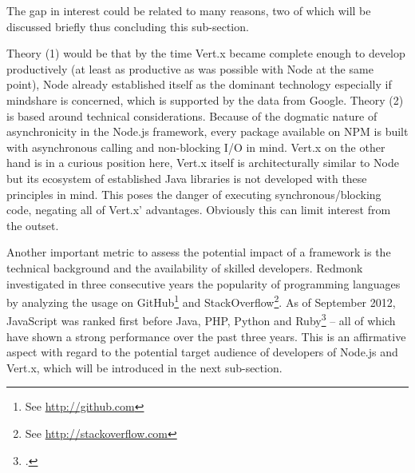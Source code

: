The gap in interest could be related to many reasons, two of which will be discussed briefly thus concluding this sub-section.

Theory (1) would be that by the time Vert.x became complete enough to develop productively (at least as productive as was possible with Node at the same point), Node already established itself as the dominant technology especially if mindshare is concerned, which is supported by the data from Google.
Theory (2) is based around technical considerations. Because of the dogmatic nature of asynchronicity in the Node.js framework, every package available on NPM is built with asynchronous calling and non-blocking I/O in mind. Vert.x on the other hand is in a curious position here, Vert.x itself is architecturally similar to Node but its ecosystem of established Java libraries is not developed with these principles in mind. This poses the danger of executing synchronous/blocking code, negating all of Vert.x' advantages. Obviously this can limit interest from the outset.

Another important metric to assess the potential impact of a framework is the technical background and the availability of skilled developers. Redmonk investigated in three consecutive years the popularity of programming languages by analyzing the usage on GitHub\footnote{See \url{http://github.com}} and StackOverflow\footnote{See \url{http://stackoverflow.com}}. As of September 2012, JavaScript was ranked first before Java, PHP, Python and Ruby\footcite[Cf.][]{Redmonk_2012} – all of which have shown a strong performance over the past three years. This is an affirmative aspect with regard to the potential target audience of developers of Node.js and Vert.x, which will be introduced in the next sub-section.

